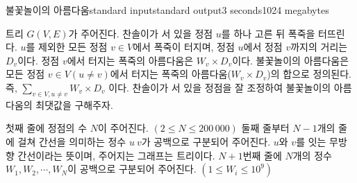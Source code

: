\begin{problem}{불꽃놀이의 아름다움}{standard input}{standard output}{3 seconds}{1024 megabytes}

트리 $G(V, E)$가 주어진다. 찬솔이가 서 있을 정점 $u$를 하나 고른 뒤 폭죽을 터뜨린다. $u$를 제외한 모든 정점 $v\in V$에서 폭죽이 터지며, 정점 $u$에서 정점 $v$까지의 거리는 $D_v$이다.
정점 $v$에서 터지는 폭죽의 아름다움은 $W_v \times D_v$이다. 불꽃놀이의 아름다움은 모든 정점 $v\in V (u\neq v)$에서 터지는 폭죽의 아름다움($W_v \times D_v$)의 합으로 정의된다. 즉, $\sum_{v\in V, u\neq v} W_v \times D_v$ 이다. 찬솔이가 서 있을 정점을 잘 조정하여 불꽃놀이의 아름다움의 최댓값을 구해주자.


\InputFile
첫째 줄에 정점의 수 $N$이 주어진다. $(2\leq N\leq 200\,000)$
둘째 줄부터 $N-1$개의 줄에 걸쳐 간선을 의미하는 정수 $u\ v$가 공백으로 구분되어 주어진다. $u$와 $v$를 잇는 무방향 간선이라는 뜻이며, 주어지는 그래프는 트리이다.
$N+1$번째 줄에 $N$개의 정수 $W_1, W_2, \cdots, W_N$이 공백으로 구분되어 주어진다. $(1\leq W_i \leq 10^9)$

\Example

\begin{example}
%
\end{example}

\end{problem}

